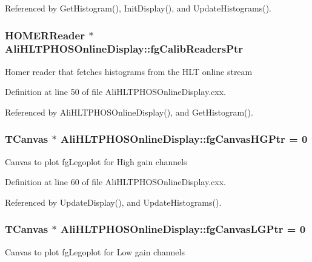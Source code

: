 Referenced by Get\-Histogram(), Init\-Display(), and Update\-Histograms().
\subsubsection{\setlength{\rightskip}{0pt plus 5cm}HOMERReader $\ast$ {\bf Ali\-HLTPHOSOnline\-Display::fg\-Calib\-Readers\-Ptr}\hspace{0.3cm}{\tt  [static, private]}}\label{classAliHLTPHOSOnlineDisplay_v53}


Homer reader that fetches histograms from the HLT online stream 

Definition at line 50 of file Ali\-HLTPHOSOnline\-Display.cxx.

Referenced by Ali\-HLTPHOSOnline\-Display(), and Get\-Histogram().
\subsubsection{\setlength{\rightskip}{0pt plus 5cm}TCanvas $\ast$ {\bf Ali\-HLTPHOSOnline\-Display::fg\-Canvas\-HGPtr} = 0\hspace{0.3cm}{\tt  [static, private]}}\label{classAliHLTPHOSOnlineDisplay_v46}


Canvas to plot fg\-Legoplot for High gain channels 

Definition at line 60 of file Ali\-HLTPHOSOnline\-Display.cxx.

Referenced by Update\-Display(), and Update\-Histograms().
\subsubsection{\setlength{\rightskip}{0pt plus 5cm}TCanvas $\ast$ {\bf Ali\-HLTPHOSOnline\-Display::fg\-Canvas\-LGPtr} = 0\hspace{0.3cm}{\tt  [static, private]}}\label{classAliHLTPHOSOnlineDisplay_v47}


Canvas to plot fg\-Legoplot for Low gain channels 

